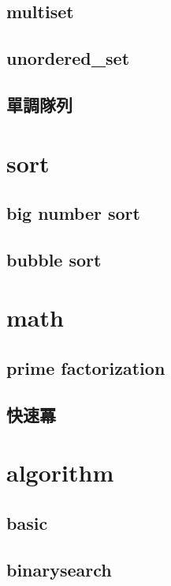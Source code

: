     \subsection{multiset}
        
    \subsection{unordered\_set}
        
    \subsection{單調隊列}
        

\section{sort}
    \subsection{big number sort}
        
    \subsection{bubble sort}
        

\section{math}
        \subsection{prime factorization}
                
        \subsection{快速冪}
            

\section{algorithm}
    \subsection{basic}
        
    \subsection{binarysearch}
        
